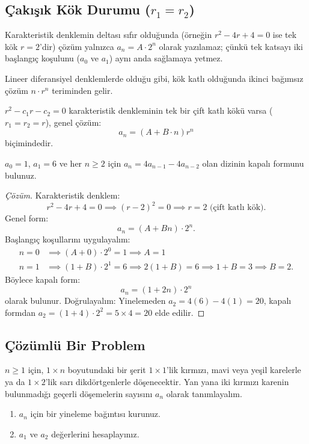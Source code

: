 \subsection{Çakışık Kök Durumu ($r_1 = r_2$)}

Karakteristik denklemin deltası sıfır olduğunda (örneğin $r^2 - 4r + 4 = 0$ ise tek kök $r = 2$'dir) çözüm yalnızca $a_n = A \cdot 2^n$ olarak yazılamaz; çünkü tek katsayı iki başlangıç koşulunu ($a_0$ ve $a_1$) aynı anda sağlamaya yetmez. 

Lineer diferansiyel denklemlerde olduğu gibi, kök katlı olduğunda ikinci bağımsız çözüm $n \cdot r^n$ teriminden gelir.

\begin{theorem}
$r^2 - c_1 r - c_2 = 0$ karakteristik denkleminin tek bir çift katlı kökü varsa ($r_1 = r_2 = r$), genel çözüm:
\[
a_n = (A + B \cdot n) r^n
\]
biçimindedir.
\end{theorem}

\begin{example}
$a_0 = 1$, $a_1 = 6$ ve her $n \ge 2$ için $a_n = 4a_{n-1} - 4a_{n-2}$ olan dizinin kapalı formunu bulunuz.
\end{example}

\begin{proof}[Çözüm]
Karakteristik denklem:
\[
r^2 - 4r + 4 = 0 \implies (r - 2)^2 = 0 \implies r = 2 \text{ (çift katlı kök)}.
\]
Genel form:
\[
a_n = (A + Bn) \cdot 2^n.
\]
Başlangıç koşullarını uygulayalım:
\begin{align*}
n = 0 &\implies (A + 0) \cdot 2^0 = 1 \implies A = 1 \\
n = 1 &\implies (1 + B) \cdot 2^1 = 6 \implies 2(1 + B) = 6 \implies 1 + B = 3 \implies B = 2.
\end{align*}
Böylece kapalı form:
\[
a_n = (1 + 2n) \cdot 2^n
\]
olarak bulunur. Doğrulayalım: Yinelemeden $a_2 = 4(6) - 4(1) = 20$, kapalı formdan $a_2 = (1 + 4) \cdot 2^2 = 5 \times 4 = 20$ elde edilir.
\end{proof}

\subsection{Çözümlü Bir Problem}

\begin{example}
$n \ge 1$ için, $1 \times n$ boyutundaki bir şerit $1 \times 1$'lik kırmızı, mavi veya yeşil karelerle ya da $1 \times 2$'lik sarı dikdörtgenlerle döşenecektir. Yan yana iki kırmızı karenin bulunmadığı geçerli döşemelerin sayısını $a_n$ olarak tanımlayalım.
\begin{enumerate}
    \item[a)] $a_n$ için bir yineleme bağıntısı kurunuz.
    \item[b)] $a_1$ ve $a_2$ değerlerini hesaplayınız.
\end{enumerate}
\end{example}

